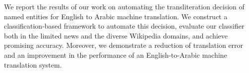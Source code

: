 We report the results of our work on automating the transliteration decision of named entities for English to Arabic machine translation. We construct a
 classification-based framework to automate this decision, evaluate our
 classifier both in the limited news and the diverse Wikipedia domains, and
 achieve promising accuracy.  Moreover, we demonstrate a reduction of
 translation error and an improvement in the performance of an English-to-Arabic
 machine translation system.

